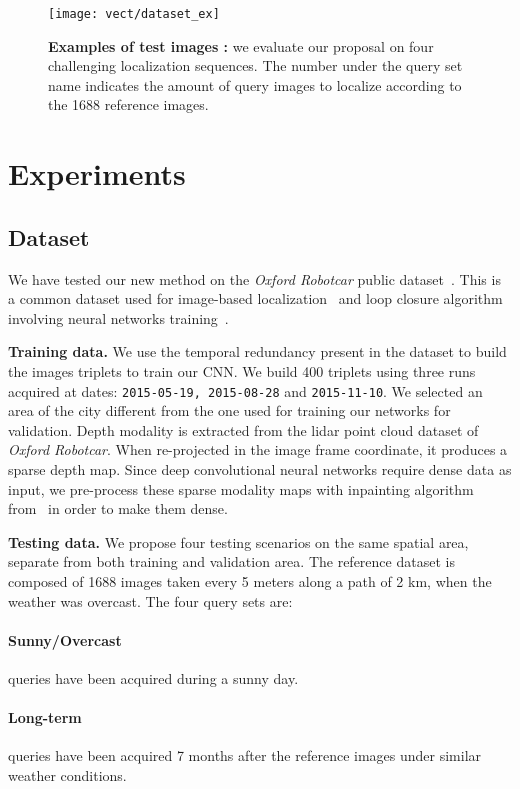 \begin{figure}
	\center
	\texttt{[image: vect/dataset\_ex]}
	\caption{\label{fig:dataset} \textbf{Examples of test images :} we evaluate our proposal on four challenging localization sequences. The number under the query set name indicates the amount of query images to localize according to the 1688 reference images.}
\end{figure}

\section{Experiments}
\label{sec:experiments}

\subsection{Dataset}
\label{subsec:dataset}
	We have tested our new method on the \textit{Oxford Robotcar} public dataset~\cite{Maddern2016}. This is a common dataset used for image-based localization~\cite{Sattler2018} and loop closure algorithm involving neural networks training~\cite{Porav2018}.
		
\vspace{4pt}\noindent\textbf{Training data.}
	We use the temporal redundancy present in the dataset to build the images triplets to train our CNN. We build 400 triplets using three runs acquired at dates: \texttt{2015-05-19, 2015-08-28} and \texttt{2015-11-10}. We selected an area of the city different from the one used for training our networks for validation.
	Depth modality is extracted from the lidar point cloud dataset of \textit{Oxford Robotcar}. When re-projected in the image frame coordinate, it produces a sparse depth map. Since deep convolutional neural networks require dense data as input, we pre-process these sparse modality maps with inpainting algorithm from~\cite{Bevilacqua2017} in order to make them dense.

\vspace{4pt}\noindent\textbf{Testing data.} We propose four testing scenarios on the same spatial area, separate from both training and validation area. The reference dataset is composed of 1688 images taken every 5 meters along a path of 2 km, when the weather was overcast. The four query sets are:
	\paragraph{Sunny/Overcast} queries have been acquired during a sunny day.
	\paragraph{Long-term} queries have been acquired 7 months after the reference images under similar weather conditions.
